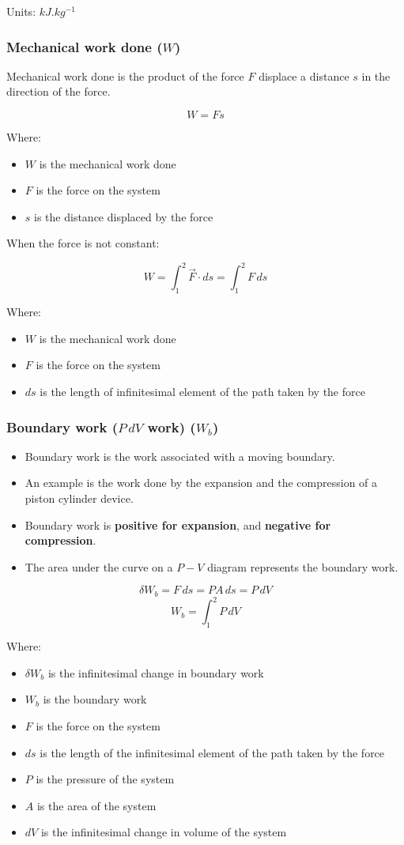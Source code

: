 \documentclass[11pt]{article}
\begin{document}
Units: \(\unit{kJ.kg^{-1}}\)
\subsubsection{Mechanical work done (\(W\))}
\label{sec:org3e5b600}
Mechanical work done is the product of the force \(F\) displace a distance \(s\) in the direction of the force.

\[W = Fs\]

Where:
\begin{itemize}
\item \(W\) is the mechanical work done
\item \(F\) is the force on the system
\item \(s\) is the distance displaced by the force
\end{itemize}

When the force is not constant:

\[W = \int_1^2 \vec{F} \cdot ds = \int_1^2 F \, ds\]

Where:
\begin{itemize}
\item \(W\) is the mechanical work done
\item \(F\) is the force on the system
\item \(ds\) is the length of infinitesimal element of the path taken by the force
\end{itemize}

\newpage
\subsubsection{Boundary work (\(P \, dV\) work) (\(W_b\))}
\label{sec:orgfc06a0e}
\begin{itemize}
\item Boundary work is the work associated with a moving boundary.
\item An example is the work done by the expansion and the compression of a piston cylinder device.
\item Boundary work is \textbf{positive for expansion}, and \textbf{negative for compression}.
\item The area under the curve on a \(P - V\) diagram represents the boundary work.
\end{itemize}

\[\delta W_b = F \, ds = PA \, ds = P \, dV\]
\[W_b = \int_1^2 P \, dV\]

Where:
\begin{itemize}
\item \(\delta W_b\) is the infinitesimal change in boundary work
\item \(W_b\) is the boundary work
\item \(F\) is the force on the system
\item \(ds\) is the length of the infinitesimal element of the path taken by the force
\item \(P\) is the pressure of the system
\item \(A\) is the area of the system
\item \(dV\) is the infinitesimal change in volume of the system
\end{itemize}
\end{document}

